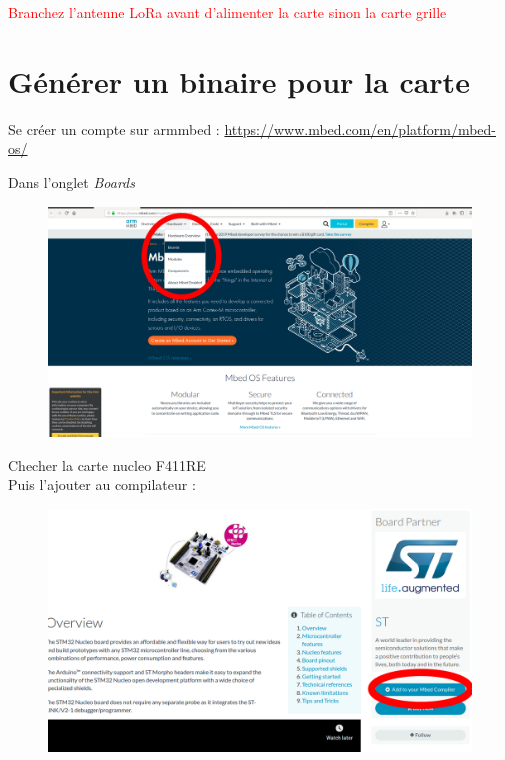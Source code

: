 \documentclass{article}
\begin{document}
\textcolor{red}{Branchez l'antenne LoRa avant d'alimenter la carte sinon la carte grille}





\section{Générer un binaire pour la carte}

Se créer un compte sur armmbed : \url{https://www.mbed.com/en/platform/mbed-os/}

Dans l'onglet \textit{Boards}\\

\begin{figure}[H]
\begin{center}
\advance\leftskip-3cm
\advance\rightskip-3cm
\includegraphics[keepaspectratio=true,scale=0.3]{hardawre_boards.png}
\label{visina8}
\end{center}\end{figure}

Checher la carte nucleo F411RE\\
Puis l'ajouter au compilateur : \\
\begin{figure}[H]
\begin{center}
\advance\leftskip-3cm
\advance\rightskip-3cm
\includegraphics[keepaspectratio=true,scale=0.3]{addtocoMpiler.png}
\label{visina8}
\end{center}\end{figure}
\end{document}
